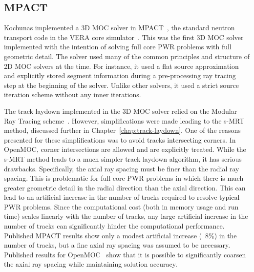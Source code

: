 
\subsection{MPACT}
\label{sec:mpact}

Kochunas implemented a 3D \ac{MOC} solver in MPACT~\cite{mpact_initial, kochunas}, the standard neutron transport code in the VERA core simulator~\cite{vera}.  This was the first 3D \ac{MOC} solver implemented with the intention of solving full core PWR problems with full geometric detail. The solver used many of the common principles and structure of 2D \ac{MOC} solvers at the time. For instance, it used a flat source approximation and explicitly stored segment information during a pre-processing ray tracing step at the beginning of the solver. Unlike other solvers, it used a strict source iteration scheme without any inner iterations. 

The track laydown implemented in the 3D \ac{MOC} solver relied on the Modular Ray Tracing scheme~\cite{liu_mrt}. However, simplifications were made leading to the s-MRT method, discussed further in Chapter~\ref{chap:track-laydown}. One of the reasons presented for these simplifications was to avoid tracks intersecting corners. In OpenMOC, corner intersections are allowed and are explicitly treated. While the s-MRT method leads to a much simpler track laydown algorithm, it has serious drawbacks. Specifically, the axial ray spacing must be finer than the radial ray spacing. This is problematic for full core \ac{PWR} problems in which there is much greater geometric detail in the radial direction than the axial direction. This can lead to an artificial increase in the number of tracks required to resolve typical \ac{PWR} problems. Since the computational cost (both in memory usage and run time) scales linearly with the number of tracks, any large artificial increase in the number of tracks can significantly hinder the computational performance. Published MPACT results show only a modest artificial increase (~8\%) in the number of tracks, but a fine axial ray spacing was assumed to be necessary. Published results for OpenMOC~\cite{shaner-laydown, openmoc-beavrs} show that it is possible to significantly coarsen the axial ray spacing while maintaining solution accuracy.

